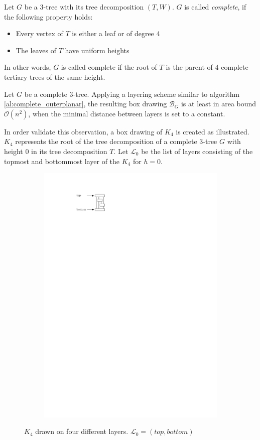 \begin{definition}
	Let $G$ be a 3-tree with its tree decomposition $(T,W)$. $G$ is called \emph{complete}, if the following property holds:
	\begin{itemize}
		\item Every vertex of $T$ is either a leaf or of degree 4
		\item The leaves of $T$ have uniform heights
	\end{itemize}
	In other words, $G$ is called complete if the root of $T$ is the parent of 4 complete tertiary trees of the same height.
\end{definition}

\begin{observation}
	Let $G$ be a complete 3-tree. Applying a layering scheme similar to algorithm \ref{al:complete_outerplanar}, the resulting box drawing $\mathcal{B}_G$ is at least in area bound $\mathcal{O}(n^2)$, when the minimal distance between layers is set to a constant.
\end{observation}

In order validate this observation, a box drawing of $K_4$ is created as illustrated. $K_4$ represents the root of the tree decomposition of a complete 3-tree $G$ with height 0 in its tree decomposition $T$. Let $\mathcal{L}_0$ be the list of layers consisting of the topmost and bottommost layer of the $K_4$ for $h=0$.

\begin{figure}[H]
	\centering
	\begin{subfigure}{\textwidth}
		\centering
		\includegraphics[page=1,width=0.4\linewidth]{graphics/3-tree_example.pdf}
	\end{subfigure}
	\caption*{$K_4$ drawn on four different layers. $\mathcal{L}_0 = (top, bottom)$}
\end{figure}

